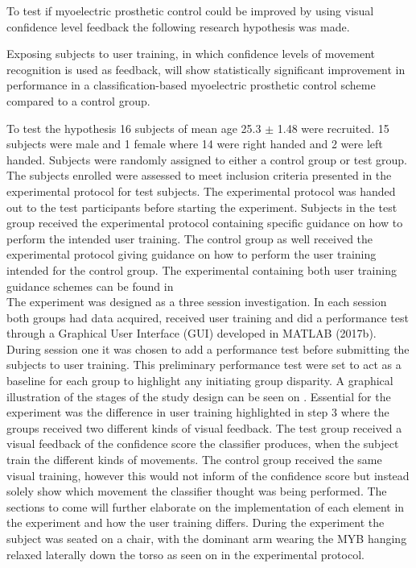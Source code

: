 To test if myoelectric prosthetic control could be improved by using visual confidence level feedback the following research hypothesis was made.  
\begin{center}
	Exposing subjects to user training, in which confidence levels of movement recognition is used as feedback, will show statistically significant improvement in performance in a classification-based myoelectric prosthetic control scheme compared to a control group.
\end{center}


To test the hypothesis 16 subjects of mean age 25.3 $\pm$ 1.48 were recruited. 15 subjects were male and 1 female where 14 were right handed and 2 were left handed. Subjects were randomly assigned to either a control group or test group. The subjects enrolled were assessed to meet inclusion criteria presented in the experimental protocol for test subjects. The experimental protocol was handed out to the test participants before starting the experiment. Subjects in the test group received the experimental protocol containing specific guidance on how to perform the intended user training. The control group as well received the experimental protocol giving guidance on how to perform the user training intended for the control group. The experimental containing both user training guidance schemes can be found in  \\
The experiment was designed as a three session investigation. In each session both groups had data acquired, received user training and did a performance test through a Graphical User Interface (GUI) developed in MATLAB (2017b). During session one it was chosen to add a performance test before submitting the subjects to user training. This preliminary performance test were set to act as a baseline for each group to highlight any initiating group disparity. A graphical illustration of the stages of the study design can be seen on . Essential for the experiment was the difference in user training highlighted in step 3 where the groups received two different kinds of visual feedback. The test group received a visual feedback of the confidence score the classifier produces, when the subject train the different kinds of movements. The control group received the same visual training, however this would not inform of the confidence score but instead solely show which movement the classifier thought was being performed. The sections to come will further elaborate on the implementation of each element in the experiment and how the user training differs. During the experiment the subject was seated on a chair, with the dominant arm wearing the MYB hanging relaxed laterally down the torso as seen on  in the experimental protocol. 

